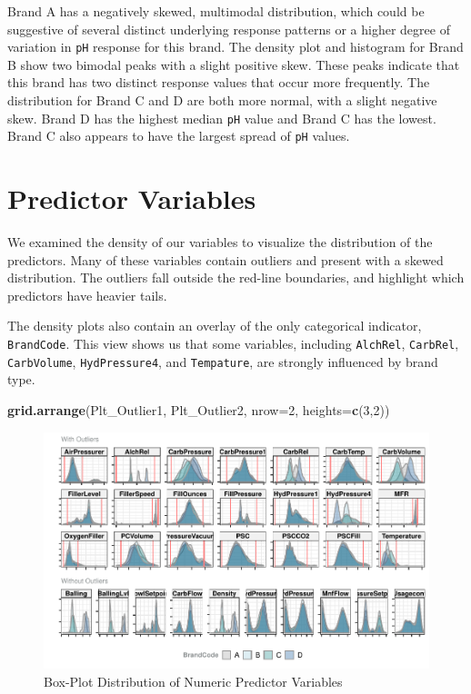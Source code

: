 \documentclass[]{report}
\newenvironment{Shaded}{\begin{snugshade}}{\end{snugshade}}
\newcommand{\DataTypeTok}[1]{\textcolor[rgb]{0.13,0.29,0.53}{#1}}
\newcommand{\DecValTok}[1]{\textcolor[rgb]{0.00,0.00,0.81}{#1}}
\newcommand{\KeywordTok}[1]{\textcolor[rgb]{0.13,0.29,0.53}{\textbf{#1}}}
\newcommand{\NormalTok}[1]{#1}
\begin{document}
Brand A has a negatively skewed, multimodal distribution, which could be
suggestive of several distinct underlying response patterns or a higher
degree of variation in \texttt{pH} response for this brand. The density
plot and histogram for Brand B show two bimodal peaks with a slight
positive skew. These peaks indicate that this brand has two distinct
response values that occur more frequently. The distribution for Brand C
and D are both more normal, with a slight negative skew. Brand D has the
highest median \texttt{pH} value and Brand C has the lowest. Brand C
also appears to have the largest spread of \texttt{pH} values.

\hypertarget{predictor-variables}{%
\section{Predictor Variables}\label{predictor-variables}}

We examined the density of our variables to visualize the distribution
of the predictors. Many of these variables contain outliers and present
with a skewed distribution. The outliers fall outside the red-line
boundaries, and highlight which predictors have heavier tails.

The density plots also contain an overlay of the only categorical
indicator, \texttt{BrandCode}. This view shows us that some variables,
including \texttt{AlchRel}, \texttt{CarbRel}, \texttt{CarbVolume},
\texttt{HydPressure4}, and \texttt{Tempature}, are strongly influenced
by brand type.

\begin{Shaded}
\begin{Highlighting}[]
\KeywordTok{grid.arrange}\NormalTok{(Plt_Outlier1, Plt_Outlier2, }\DataTypeTok{nrow=}\DecValTok{2}\NormalTok{, }\DataTypeTok{heights=}\KeywordTok{c}\NormalTok{(}\DecValTok{3}\NormalTok{,}\DecValTok{2}\NormalTok{))}
\end{Highlighting}
\end{Shaded}

\begin{figure}
\centering
\includegraphics{Proj2-JM_files/figure-latex/unnamed-chunk-3-1.pdf}
\caption{Box-Plot Distribution of Numeric Predictor Variables}
\end{figure}
\end{document}
